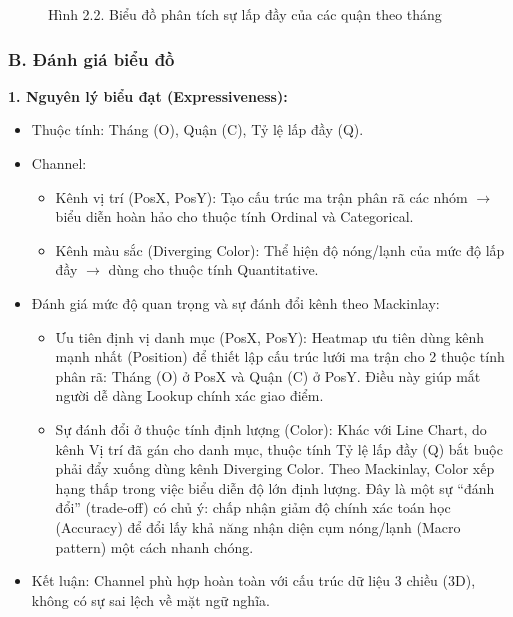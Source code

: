 \begin{figure}[H]
    \centering
    \caption{Hình 2.2. Biểu đồ phân tích sự lấp đầy của các quận theo tháng}
    \label{fig:domain-task2-chart2}
\end{figure}

\subsubsection*{B. Đánh giá biểu đồ}

\textbf{1. Nguyên lý biểu đạt (Expressiveness):}

\begin{itemize}
    \item Thuộc tính: Tháng (O), Quận (C), Tỷ lệ lấp đầy (Q).
    \item Channel:
    \begin{itemize}
        \item Kênh vị trí (PosX, PosY): Tạo cấu trúc ma trận phân rã các nhóm $\rightarrow$ biểu diễn hoàn hảo cho thuộc tính Ordinal và Categorical.
        \item Kênh màu sắc (Diverging Color): Thể hiện độ nóng/lạnh của mức độ lấp đầy $\rightarrow$ dùng cho thuộc tính Quantitative.
    \end{itemize}
    \item Đánh giá mức độ quan trọng và sự đánh đổi kênh theo Mackinlay:
    \begin{itemize}
        \item Ưu tiên định vị danh mục (PosX, PosY): Heatmap ưu tiên dùng kênh mạnh nhất (Position) để thiết lập cấu trúc lưới ma trận cho 2 thuộc tính phân rã: Tháng (O) ở PosX và Quận (C) ở PosY. Điều này giúp mắt người dễ dàng Lookup chính xác giao điểm.
        \item Sự đánh đổi ở thuộc tính định lượng (Color): Khác với Line Chart, do kênh Vị trí đã gán cho danh mục, thuộc tính Tỷ lệ lấp đầy (Q) bắt buộc phải đẩy xuống dùng kênh Diverging Color. Theo Mackinlay, Color xếp hạng thấp trong việc biểu diễn độ lớn định lượng. Đây là một sự ``đánh đổi'' (trade-off) có chủ ý: chấp nhận giảm độ chính xác toán học (Accuracy) để đổi lấy khả năng nhận diện cụm nóng/lạnh (Macro pattern) một cách nhanh chóng.
    \end{itemize}
    \item Kết luận: Channel phù hợp hoàn toàn với cấu trúc dữ liệu 3 chiều (3D), không có sự sai lệch về mặt ngữ nghĩa.
\end{itemize}

